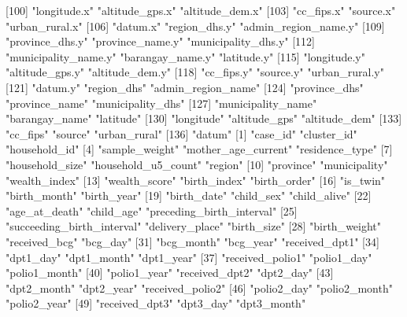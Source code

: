 [100] "longitude.x"               "altitude_gps.x"            "altitude_dem.x"           
[103] "cc_fips.x"                 "source.x"                  "urban_rural.x"            
[106] "datum.x"                   "region_dhs.y"              "admin_region_name.y"      
[109] "province_dhs.y"            "province_name.y"           "municipality_dhs.y"       
[112] "municipality_name.y"       "barangay_name.y"           "latitude.y"               
[115] "longitude.y"               "altitude_gps.y"            "altitude_dem.y"           
[118] "cc_fips.y"                 "source.y"                  "urban_rural.y"            
[121] "datum.y"                   "region_dhs"                "admin_region_name"        
[124] "province_dhs"              "province_name"             "municipality_dhs"         
[127] "municipality_name"         "barangay_name"             "latitude"                 
[130] "longitude"                 "altitude_gps"              "altitude_dem"             
[133] "cc_fips"                   "source"                    "urban_rural"              
[136] "datum"                    
  [1] "case_id"                   "cluster_id"                "household_id"             
  [4] "sample_weight"             "mother_age_current"        "residence_type"           
  [7] "household_size"            "household_u5_count"        "region"                   
 [10] "province"                  "municipality"              "wealth_index"             
 [13] "wealth_score"              "birth_index"               "birth_order"              
 [16] "is_twin"                   "birth_month"               "birth_year"               
 [19] "birth_date"                "child_sex"                 "child_alive"              
 [22] "age_at_death"              "child_age"                 "preceding_birth_interval" 
 [25] "succeeding_birth_interval" "delivery_place"            "birth_size"               
 [28] "birth_weight"              "received_bcg"              "bcg_day"                  
 [31] "bcg_month"                 "bcg_year"                  "received_dpt1"            
 [34] "dpt1_day"                  "dpt1_month"                "dpt1_year"                
 [37] "received_polio1"           "polio1_day"                "polio1_month"             
 [40] "polio1_year"               "received_dpt2"             "dpt2_day"                 
 [43] "dpt2_month"                "dpt2_year"                 "received_polio2"          
 [46] "polio2_day"                "polio2_month"              "polio2_year"              
 [49] "received_dpt3"             "dpt3_day"                  "dpt3_month"               
